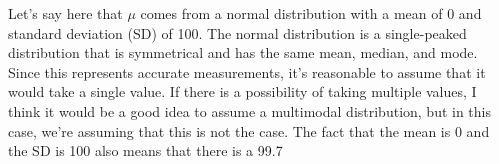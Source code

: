 \documentclass{ltjsbook}
\begin{document}
Let's say here that $\mu$ comes from a normal distribution with a mean of 0 and standard deviation (SD) of 100. The normal distribution is a single-peaked distribution that is symmetrical and has the same mean, median, and mode. Since this represents accurate measurements, it's reasonable to assume that it would take a single value. If there is a possibility of taking multiple values, I think it would be a good idea to assume a multimodal distribution, but in this case, we're assuming that this is not the case. The fact that the mean is 0 and the SD is 100 also means that there is a 99.7%
\end{document}
